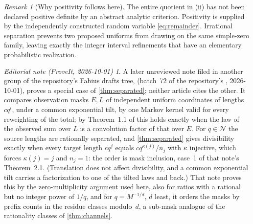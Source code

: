 \documentclass[11pt,letterpaper]{article}
\theoremstyle{definition}
\theoremstyle{remark}
\newtheorem{remark}[theorem]{Remark}
\newtheorem*{ednotelater}{Editorial note (ProveIt, 2026-10-01)}
\newcommand{\NR}{\mathcal N}
\numberwithin{equation}{section}
\begin{document}
\begin{remark}[Why positivity follows here]
The entire quotient in (ii) has not been declared positive definite by an abstract analytic criterion. Positivity is supplied by the independently constructed random variable \eqref{eq:remainder}. Irrational separation prevents two proposed uniforms from drawing on the same simple-zero family, leaving exactly the integer interval refinements that have an elementary probabilistic realization.
\end{remark}
\begin{ednotelater}
A later unreviewed note filed in another group of the repository's Fabius
drafts tree, 
(batch~72 of the repository's , 2026-10-01), proves a special case of
\cref{thm:separated}; neither article cites the other. It compares observation
masks $E,L$ of independent uniform coordinates of lengths $cq^i$, under a
common exponential tilt, by one Markov kernel valid for every reweighting of
the total; by Theorem~1.1 of
 this holds
exactly when the law of the observed sum over $L$ is a convolution factor of
that over $E$. For $q\in\NR$ the source lengths are rationally separated, and
\cref{thm:separated} gives divisibility exactly when every target length
$cq^j$ equals $cq^{\kappa(j)}/n_j$ with $\kappa$ injective, which forces
$\kappa(j)=j$ and $n_j=1$: the order is mask inclusion, case~1 of that note's
Theorem~2.1. (Translation does not affect divisibility, and a common
exponential tilt carries a factorization to one of the tilted laws and back.)
That note proves this by the zero-multiplicity argument used here, also for
ratios with a rational but no integer power of $1/q$, and for $q=M^{-1/d}$,
$d$ least, it orders the masks by prefix counts in the residue classes
modulo~$d$, a sub-mask analogue of the rationality classes of
\cref{thm:channels}.
\end{ednotelater}
\end{document}
